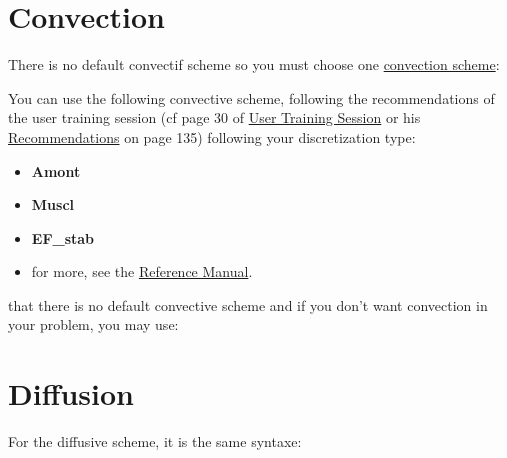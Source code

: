 \section{Convection}
There is no default convectif scheme so you must choose one \href{TRUST_Reference_Manual.pdf\#blocconvection}{convection scheme}:
    \begin{center}
    \end{center}

You can use the following convective scheme, following the recommendations of the user training session (cf page 30 of \href{TRUST_and_TrioCFD_presentation.pdf}{User Training Session} or his \href{TRUST_and_TrioCFD_presentation.pdf}{Recommendations} on page 135) following your discretization type:
\begin{itemize}
\item \textbf{Amont}
\item \textbf{Muscl}
\item \textbf{EF\_stab}
\item for more, see the \href{TRUST_Reference_Manual.pdf\#blocconvection}{\trust Reference Manual}.
\end{itemize}

\Note that there is no default convective scheme and if you don't want convection in your problem, you may use:

    \begin{center}
    \end{center}

\section{Diffusion}
For the diffusive scheme, it is the same syntaxe:

